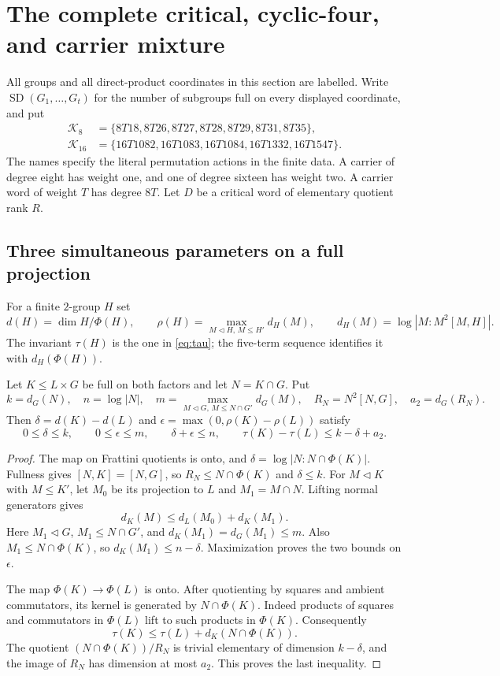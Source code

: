 \section{The complete critical, cyclic-four, and carrier mixture}
\label{sec:carrier-mixture}
All groups and all direct-product coordinates in this section are
labelled. Write $\operatorname{SD}(G_1,\ldots,G_t)$ for the number of
subgroups full on every displayed coordinate, and put
\[
 \begin{aligned}
 \mathcal K_8&=\{8T18,8T26,8T27,8T28,8T29,8T31,8T35\},\\
 \mathcal K_{16}&=\{16T1082,16T1083,16T1084,16T1332,16T1547\}.
 \end{aligned}
\]
The names specify the literal permutation actions in the finite data.
A carrier of degree eight has weight one, and one of degree sixteen
has weight two. A carrier word of weight $T$ has degree $8T$.
Let $D$ be a critical word of elementary quotient rank $R$.

\subsection{Three simultaneous parameters on a full projection}
For a finite $2$-group $H$ set
\[
 d(H)=\dim H/\Phi(H),\qquad
 \rho(H)=\max_{M\lhd H,\,M\leq H'}d_H(M),\qquad
 d_H(M)=\log|M:M^2[M,H]|.
\]
The invariant $\tau(H)$ is the one in \eqref{eq:tau}; the five-term
sequence identifies it with $d_H(\Phi(H))$.

\begin{lemma}\label{lem:carrier-transition}
Let $K\leq L\times G$ be full on both factors and let $N=K\cap G$.
Put
\[
 k=d_G(N),\quad n=\log|N|,\quad
 m=\max_{M\lhd G,\,M\leq N\cap G'}d_G(M),\quad
 R_N=N^2[N,G],\quad a_2=d_G(R_N).
\]
Then $\delta=d(K)-d(L)$ and
$\epsilon=\max(0,\rho(K)-\rho(L))$ satisfy
\begin{equation}\label{eq:carrier-polygon}
 0\leq\delta\leq k,\qquad 0\leq\epsilon\leq m,
 \qquad\delta+\epsilon\leq n,
 \qquad\tau(K)-\tau(L)\leq k-\delta+a_2.
\end{equation}
\end{lemma}
\begin{proof}
The map on Frattini quotients is onto, and
$\delta=\log|N:N\cap\Phi(K)|$. Fullness gives
$[N,K]=[N,G]$, so $R_N\leq N\cap\Phi(K)$ and $\delta\leq k$.
For $M\lhd K$ with $M\leq K'$, let $M_0$ be its projection to $L$
and $M_1=M\cap N$. Lifting normal generators gives
\[
 d_K(M)\leq d_L(M_0)+d_K(M_1).
\]
Here $M_1\lhd G$, $M_1\leq N\cap G'$, and
$d_K(M_1)=d_G(M_1)\leq m$. Also
$M_1\leq N\cap\Phi(K)$, so
$d_K(M_1)\leq n-\delta$. Maximization proves the two bounds on
$\epsilon$.

The map $\Phi(K)\to\Phi(L)$ is onto. After quotienting by squares
and ambient commutators, its kernel is generated by
$N\cap\Phi(K)$. Indeed products of squares and commutators in
$\Phi(L)$ lift to such products in $\Phi(K)$. Consequently
\[
 \tau(K)\leq\tau(L)+d_K(N\cap\Phi(K)).
\]
The quotient $(N\cap\Phi(K))/R_N$ is trivial elementary of dimension
$k-\delta$, and the image of $R_N$ has dimension at most $a_2$.
This proves the last inequality.
\end{proof}

